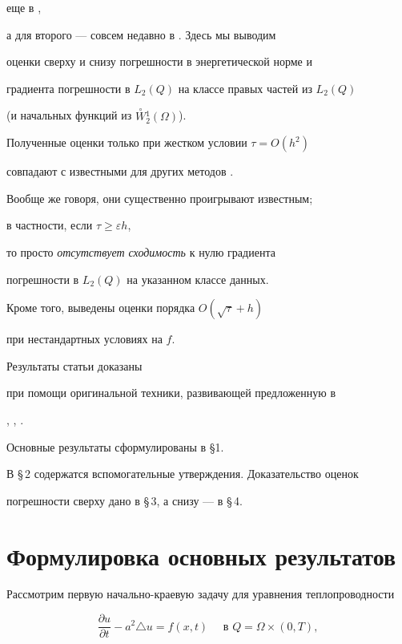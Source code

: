 еще в \cite{Z2},


а для второго --- совсем недавно в \cite{Za}.  Здесь  мы выводим


оценки сверху и снизу погрешности в энергетической норме и


градиента погрешности в $L_2(Q)$ на классе правых частей из $L_2(Q)$


(и начальных функций из $\overset{\circ}{W}{}^1_2(\Omega)$). 


Полученные оценки только при жестком условии $\tau=O(h^2)$


совпадают с известными для других методов \cite{Z3}.


Вообще же говоря, они существенно проигрывают известным;


в частности, если $\tau\ge \varepsilon h$, 


то просто {\it отсутствует сходимость} к нулю градиента


погрешности в $L_2(Q)$ на указанном классе данных. 


Кроме того, выведены оценки порядка $O(\sqrt\tau+h)$


при  нестандартных условиях на $f$.


Результаты статьи доказаны 


при помощи оригинальной техники, развивающей предложенную в


\cite{Z2}, \cite{Z6}, \cite{Za}.





Основные результаты сформулированы в \S1.


В \S\,2 содержатся вспомогательные утверждения. Доказательство оценок


погрешности сверху дано в \S\,3, а снизу --- в \S\,4.





\section{Формулировка основных результатов}





Рассмотрим первую начально-краевую задачу для уравнения теплопроводности


\begin{equation}


\frac{\partial u}{\partial t}-a^2\triangle u= f(x,t)\quad\text{ в } 


Q=\Omega\times(0,T),


\end{equation}



